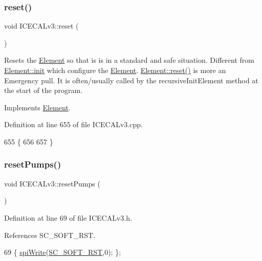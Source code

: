 \subsubsection{\texorpdfstring{reset()}{reset()}}
{\footnotesize\ttfamily void I\+C\+E\+C\+A\+Lv3\+::reset (\begin{DoxyParamCaption}{ }\end{DoxyParamCaption})\hspace{0.3cm}{\ttfamily [virtual]}}

Resets the \hyperlink{classElement}{Element} so that is is in a standard and safe situation. Different from \hyperlink{classElement_af42754b5cabc198869222725218d695c}{Element\+::init} which configure the \hyperlink{classElement}{Element}. \hyperlink{classElement_a69efffa22f06909d768149715565cb56}{Element\+::reset()} is more an Emergency pull. It is often/usually called by the recursive\+Init\+Element method at the start of the program. 

Implements \hyperlink{classElement_a69efffa22f06909d768149715565cb56}{Element}.



Definition at line 655 of file I\+C\+E\+C\+A\+Lv3.\+cpp.


\begin{DoxyCode}
655                     \{
656 
657 \}
\end{DoxyCode}
\mbox{\label{classICECALv3_a1b9ca0e09d45634a70da6f19a7257314}} 
\subsubsection{\texorpdfstring{reset\+Pumps()}{resetPumps()}}
{\footnotesize\ttfamily void I\+C\+E\+C\+A\+Lv3\+::reset\+Pumps (\begin{DoxyParamCaption}{ }\end{DoxyParamCaption})\hspace{0.3cm}{\ttfamily [inline]}}



Definition at line 69 of file I\+C\+E\+C\+A\+Lv3.\+h.



References S\+C\+\_\+\+S\+O\+F\+T\+\_\+\+R\+ST.


\begin{DoxyCode}
69 \{                                       \hyperlink{classICECALv3_aef00f02801dea4bda2093c930501dcdd}{spiWrite}(\hyperlink{ICECALv3_8h_adfc33152f992de37ef835a719df6c934}{SC\_SOFT\_RST},0);                                 
      \};
\end{DoxyCode}
\mbox{\label{classICECALv3_aaf38119f47401a85022ae1b0d05675bd}} 
